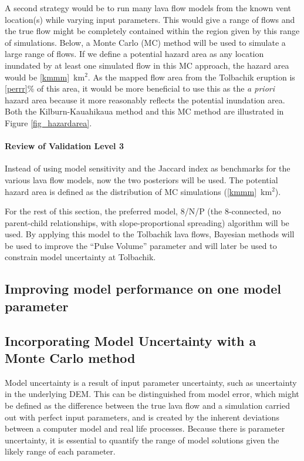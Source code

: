 \documentclass[12pt,letter]{article}
\begin{document}
	A second strategy would be to run many lava flow models from the known vent location(s) while varying input parameters. This would give a range of flows and the true flow might be completely contained within the region given by this range of simulations. Below, a Monte Carlo (MC) method will be used to simulate a large range of flows. If we define a potential hazard area as any location inundated by at least one simulated flow in this MC approach, the hazard area would be \ref{kmmm}~km$^2$. As the mapped flow area from the Tolbachik eruption is \ref{perrr}\% of this area, it would be more beneficial to use this as the \textit{a priori} hazard area because it more reasonably reflects the potential inundation area. Both the Kilburn-Kauahikaua method and this MC method are illustrated in Figure \ref{fig_hazardarea}.
	
	\paragraph{Review of Validation Level 3} Instead of using model sensitivity and the Jaccard index as benchmarks for the various lava flow models, now the two posteriors will be used. The potential hazard area is defined as the distribution of MC simulations (\ref{kmmm}~km$^2$).
	
	
	For the rest of this section, the preferred model, 8/N/P (the 8-connected, no parent-child relationships, with slope-proportional spreading) algorithm will be used. By applying this model to the Tolbachik lava flows, Bayesian methods will be used to improve the ``Pulse Volume'' parameter and will later be used to constrain model uncertainty at Tolbachik.
	
	\subsection{Improving model performance on one model parameter}
	
	
	\subsection{Incorporating Model Uncertainty with a Monte Carlo method}
		Model uncertainty is a result of input parameter uncertainty, such as uncertainty in the underlying DEM. This can be distinguished from model error, which might be defined as the difference between the true lava flow and a simulation carried out with perfect input parameters, and is created by the inherent deviations between a computer model and real life processes. Because there is parameter uncertainty, it is essential to quantify the range of model solutions given the likely range of each parameter.
		
\end{document}
